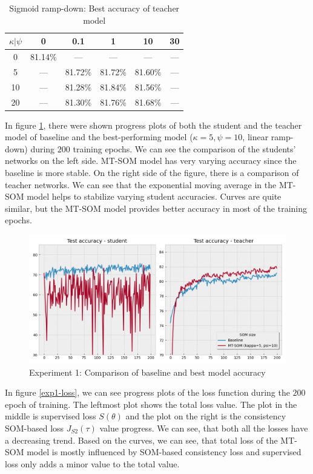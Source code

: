 \begin{table}[h!]
\centering
\begin{tabular}{|c|c|c|c|c|c|}
\hline
$\kappa | \psi$ & 0       & 0.1     & 1       & 10      & 30      \\ \hline
0           & 81.14\% & ---     & ---     & ---     & ---     \\ \hline
5           &  --- & 81.72\% & 81.72\% &  81.60\% & ---     \\ \hline
10          & ---     & 81.28\% & \color{purple}81.84\% & 81.56\% & ---  \\ \hline
20         &  ---  & 81.30\% &  \color{purple}81.76\% & 81.68\% & ---     \\ \hline

\end{tabular}
\caption{Sigmoid ramp-down: Best accuracy of teacher model}
\label{exp1-tab-sigm}
\end{table}


In figure \ref{exp1-acc}, there were shown progress plots of both the student and the teacher model of baseline and the best-performing model ($\kappa=5, \psi=10$, linear ramp-down) during $200$ training epochs. We can see the comparison of the students' networks on the left side. MT-SOM model has very varying accuracy since the baseline is more stable. On the right side of the figure, there is a comparison of teacher networks. We can see that the exponential moving average in the MT-SOM model helps to stabilize varying student accuracies. Curves are quite similar, but the MT-SOM model provides better accuracy in most of the training epochs.


\begin{figure}[h!]
    \centering
    \includegraphics[width=0.8\linewidth]{figs/fv-som-acc.png}
    \caption{Experiment 1: Comparison of baseline and best model accuracy}
    \label{exp1-acc}
\end{figure}

In figure \ref{exp1-loss}, we can see progress plots of the loss function during the $200$ epoch of training. The leftmost plot shows the total loss value. The plot in the middle is supervised loss $S(\theta)$ and the plot on the right is the consistency SOM-based loss $J_{S2}(\tau)$ value progress. We can see, that both all the losses have a decreasing trend. Based on the curves, we can see, that total loss of the MT-SOM model is mostly influenced by SOM-based consistency loss and supervised loss only adds a minor value to the total value.

